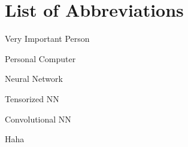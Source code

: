 \section{List of Abbreviations}

\begin{description}[leftmargin=!,labelwidth=2cm]
    \item [VIP] Very Important Person
    \item [PC] Personal Computer
    \item [NN] Neural Network
    \item [TNN] Tensorized NN
    \item [CNN] Convolutional NN
    \item [hh] Haha

\end{description}
